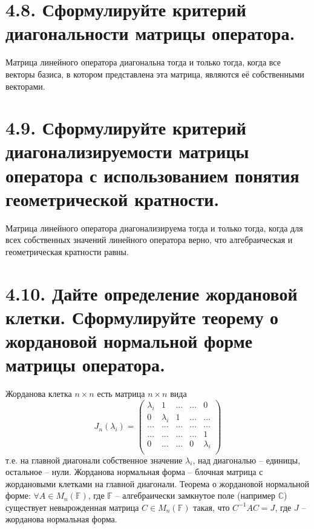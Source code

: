 \documentclass{article}
\begin{document}
\section*{\LARGE 4.8. Сформулируйте критерий диагональности матрицы оператора.}
Матрица линейного оператора диагональна тогда и только тогда, когда все векторы базиса, в котором представлена эта матрица, являются её собственными векторами. 

\section*{\LARGE 4.9. Сформулируйте критерий диагонализируемости матрицы оператора с использованием понятия геометрической кратности.}
Матрица линейного оператора диагонализируема тогда и только тогда, когда для всех собственных значений линейного оператора верно, что алгебраическая и геометрическая кратности равны.

\section*{\LARGE 4.10. Дайте определение жордановой клетки. Сформулируйте теорему о жордановой нормальной форме матрицы оператора.}
Жорданова клетка $n\times n$ есть матрица $n\times n$ вида
$$
J_n(\lambda_i) = 
\begin{pmatrix}
\lambda_i & 1 & ... & ... & 0 \\
0 & \lambda_i& 1 & ... & ... \\
... & ... & ... & ... & ... \\
... & ... & ... & ... & 1 \\
0 & ... & ... & 0 & \lambda_i \\
\end{pmatrix}
$$
т.е. на главной диагонали собственное значение $\lambda_i$, над диагональю -- единицы, остальное -- нули.
\newline Жорданова нормальная форма -- блочная матрица с жордановыми клетками на главной диагонали.
\newline Теорема о жордановой нормальной форме: $\forall A \in M_n(\mathbb{F})$, где $\mathbb{F}$ -- алгебраически замкнутое поле (например $\mathbb{C}$) существует невырожденная матрица $C \in M_n(\mathbb{F})$ такая, что $C^{-1}AC = J$, где $J$ -- жорданова нормальная форма.
\end{document}
